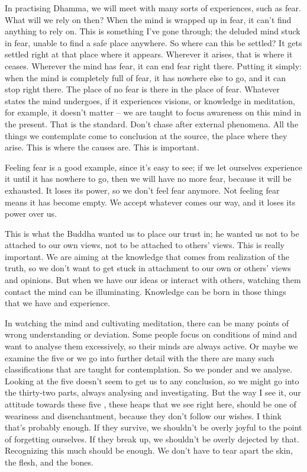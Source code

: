 In practising Dhamma, we will meet with many sorts of experiences, such as fear. What will we rely on then? When the mind is wrapped up in fear, it can't find anything to rely on. This is something I've gone through; the deluded mind stuck in fear, unable to find a safe place anywhere. So where can this be settled? It gets settled right at that place where it appears. Wherever it arises, that is where it ceases. Wherever the mind has fear, it can end fear right there. Putting it simply: when the mind is completely full of fear, it has nowhere else to go, and it can stop right there. The place of no fear is there in the place of fear. Whatever states the mind undergoes, if it experiences  visions, or knowledge in meditation, for example, it doesn't matter -- we are taught to focus awareness on this mind in the present. That is the standard. Don't chase after external phenomena. All the things we contemplate come to conclusion at the source, the place where they arise. This is where the causes are. This is important.

Feeling fear is a good example, since it's easy to see; if we let ourselves experience it until it has nowhere to go, then we will have no more fear, because it will be exhausted. It loses its power, so we don't feel fear anymore. Not feeling fear means it has become empty. We accept whatever comes our way, and it loses its power over us.

This is what the Buddha wanted us to place our trust in; he wanted us not to be attached to our own views, not to be attached to others' views. This is really important. We are aiming at the knowledge that comes from realization of the truth, so we don't want to get stuck in attachment to our own or others' views and opinions. But when we have our ideas or interact with others, watching them contact the mind can be illuminating. Knowledge can be born in those things that we have and experience.

In watching the mind and cultivating meditation, there can be many points of wrong understanding or deviation. Some people focus on conditions of mind and want to analyse them excessively, so their minds are always active. Or maybe we examine the five  or we go into further detail with the  there are many such classifications that are taught for contemplation. So we ponder and we analyse. Looking at the five  doesn't seem to get us to any conclusion, so we might go into the thirty-two parts, always analysing and investigating. But the way I see it, our attitude towards these five , these heaps that we see right here, should be one of weariness and disenchantment, because they don't follow our wishes. I think that's probably enough. If they survive, we shouldn't be overly joyful to the point of forgetting ourselves. If they break up, we shouldn't be overly dejected by that. Recognizing this much should be enough. We don't have to tear apart the skin, the flesh, and the bones.

